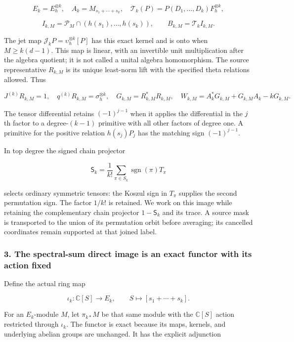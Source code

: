 \[E_k=E_h^{\otimes k},\quad A_k=M_{s_1+\cdots+s_k},\quad
\mathcal T_k(P)=P(D_1,\ldots,D_k)F_h^{\otimes k},\]

\[I_{k,M}=\mathcal P_M\cap(h(s_1),\ldots,h(s_k)),\qquad B_{k,M}=\mathcal T_k I_{k,M}.\tag{2.4}\]

The jet map \(\mathcal J_kP=\upsilon_h^{\otimes k}[P]\) has this exact
kernel and is onto when \(M\ge k(d-1)\). This map is linear, with an
invertible unit multiplication after the algebra quotient; it is not
called a unital algebra homomorphism. The source representative
\(R_{k,M}\) is its unique least-norm lift with the specified theta
relations allowed. Thus

\[J^{(k)}R_{k,M}=1,\quad q^{(k)}R_{k,M}=\sigma_h^{\otimes k},\quad
G_{k,M}=R_{k,M}^*R_{k,M},\quad
W_{k,M}=A_k^*G_{k,M}+G_{k,M}A_k-kG_{k,M}.\tag{2.5}\]

The tensor differential retains \((-1)^{j-1}\) when it applies the
differential in the \(j\)th factor to a degree-\((k-1)\) primitive with
all other factors of degree one. A primitive for the positive relation
\(h(s_j)P_j\) has the matching sign \((-1)^{j-1}\).

In top degree the signed chain projector

\[\mathsf S_k=\frac1{k!}\sum_{\pi\in S_k}\operatorname{sgn}(\pi)T_\pi\tag{2.6}\]

selects ordinary symmetric tensors: the Koszul sign in \(T_\pi\)
supplies the second permutation sign. The factor \(1/k!\) is retained.
We work on this image while retaining the complementary chain projector
\(1-\mathsf S_k\) and its trace. A source mask is transported to the
union of its permutation orbit before averaging; its cancelled
coordinates remain supported at that joined label.

\subsubsection{3. The spectral-sum direct image is an exact functor with
its action
fixed}\label{spectral_sum_full:the-spectral-sum-direct-image-is-an-exact-functor-with-its-action-fixed}

Define the actual ring map

\[\iota_k:\mathbb C[S]\longrightarrow E_k,\qquad S\longmapsto[s_1+\cdots+s_k].\tag{3.1}\]

For an \(E_k\)-module \(M\), let \(\pi_{k*}M\) be that same module with
the \(\mathbb C[S]\) action restricted through \(\iota_k\). The functor
is exact because its maps, kernels, and underlying abelian groups are
unchanged. It has the explicit adjunction

